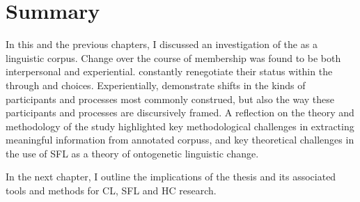 \section{Summary}

In this and the previous chapters, I discussed an investigation of the  as a linguistic \gls{corpus}. Change over the course of membership was found to be both interpersonal and experiential.  constantly renegotiate their status within the  through  and  choices. Experientially,  demonstrate shifts in the kinds of participants and processes most commonly construed, but also the way these participants and processes are discursively framed. A reflection on the theory and methodology of the study highlighted key methodological challenges in extracting meaningful information from annotated \glspl{corpus}, and key theoretical challenges in the use of \gls{SFL} as a theory of ontogenetic linguistic change.

In the next chapter, I outline the implications of the thesis and its associated tools and methods for \gls{CL}, \gls{SFL} and \gls{HC} research.

